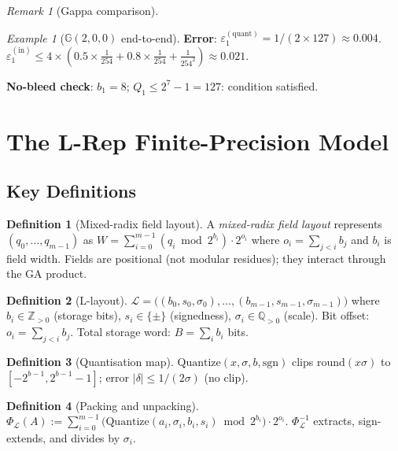 \documentclass[11pt,a4paper]{article}
\theoremstyle{definition}
\newtheorem{definition}{Definition}[section]
\theoremstyle{plain}
\theoremstyle{remark}
\newtheorem{remark}{Remark}[section]
\newtheorem{example}{Example}[section]
\newcommand{\GA}{\mathbb{G}}
\newcommand{\Quantize}{\mathrm{Quantize}}
\newcommand{\Pack}{\Phi_{\mathcal{L}}}
\newcommand{\Unpack}{\Phi^{-1}_{\mathcal{L}}}
\begin{document}
\begin{remark}[Gappa comparison]
\begin{example}[$\GA(2,0,0)$ end-to-end]
\textbf{Error}: $\varepsilon_1^{(\mathrm{quant})} = 1/(2\times127) \approx 0.004$.
$\varepsilon_1^{(\mathrm{in})} \le 4 \times (0.5\times\frac{1}{254} + 0.8\times\frac{1}{254} + \frac{1}{254^2}) \approx 0.021$.

\textbf{No-bleed check}: $b_1=8$; $Q_1 \le 2^7-1=127$: condition satisfied.
\end{example}

\section{The L-Rep Finite-Precision Model}
\label{sec:model}

\subsection{Key Definitions}

\begin{definition}[Mixed-radix field layout]\label{def:mixed-radix}
A \emph{mixed-radix field layout} represents $(q_0,\ldots,q_{m-1})$ as
$W = \sum_{i=0}^{m-1} (q_i \bmod 2^{b_i})\cdot 2^{o_i}$
where $o_i = \sum_{j<i} b_j$ and $b_i$ is field width.
Fields are positional (not modular residues); they interact through
the GA product.
\end{definition}

\begin{definition}[L-layout]\label{def:layout}
$\mathcal{L} = \bigl((b_0,s_0,\sigma_0),\ldots,(b_{m-1},s_{m-1},\sigma_{m-1})\bigr)$
where $b_i \in \mathbb{Z}_{>0}$ (storage bits), $s_i \in \{\pm\}$
(signedness), $\sigma_i \in \mathbb{Q}_{>0}$ (scale).
Bit offset: $o_i = \sum_{j<i} b_j$.
Total storage word: $B = \sum_i b_i$ bits.
\end{definition}

\begin{definition}[Quantisation map]\label{def:quantize}
$\Quantize(x,\sigma,b,\mathrm{sgn})$ clips $\mathrm{round}(x\sigma)$ to $[-2^{b-1},2^{b-1}-1]$; error $|\delta|\le 1/(2\sigma)$ (no clip).
\end{definition}

\begin{definition}[Packing and unpacking]\label{def:pack}
$\Pack(A) := \sum_{i=0}^{m-1}\bigl(\Quantize(a_i,\sigma_i,b_i,s_i)\bmod 2^{b_i}\bigr)\cdot 2^{o_i}$.
$\Unpack$ extracts, sign-extends, and divides by $\sigma_i$.
\end{definition}


\end{remark}
\end{document}
